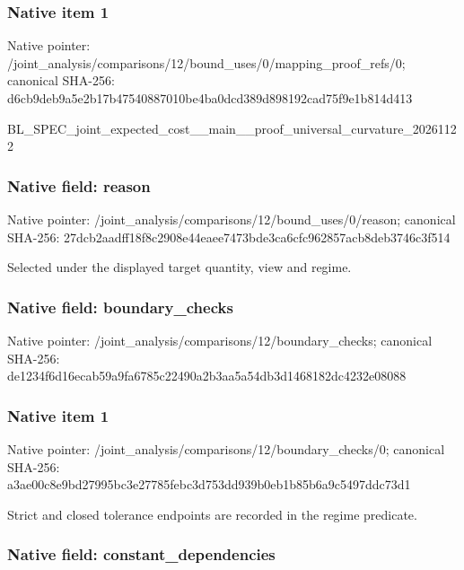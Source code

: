 \documentclass[10pt,a4paper]{article}
\begin{document}
\subsubsection{Native item 1}


Native pointer: /joint\_analysis/comparis\allowbreak{}ons/12/bound\_uses/0/mapp\allowbreak{}ing\_proof\_refs/0; canonical SHA-256: d6cb9deb9a5e2b17b4754088\allowbreak{}7010be4ba0dcd389d898192c\allowbreak{}ad75f9e1b814d413


BL\_SPEC\_joint\_expected\_c\allowbreak{}ost\_\_main\_\_proof\_univers\allowbreak{}al\_curvature\_20261122


\subsubsection{Native field: reason}


Native pointer: /joint\_analysis/comparis\allowbreak{}ons/12/bound\_uses/0/reas\allowbreak{}on; canonical SHA-256: 27dcb2aadff18f8c2908e44e\allowbreak{}aee7473bde3ca6cfc962857a\allowbreak{}cb8deb3746c3f514


Selected under the displayed target quantity, view and regime.


\subsubsection{Native field: boundary\_checks}


Native pointer: /joint\_analysis/comparis\allowbreak{}ons/12/boundary\_checks; canonical SHA-256: de1234f6d16ecab59a9fa678\allowbreak{}5c22490a2b3aa5a54db3d146\allowbreak{}8182dc4232e08088



\subsubsection{Native item 1}


Native pointer: /joint\_analysis/comparis\allowbreak{}ons/12/boundary\_checks/0; canonical SHA-256: a3ae00c8e9bd27995bc3e277\allowbreak{}85febc3d753dd939b0eb1b85\allowbreak{}b6a9c5497ddc73d1


Strict and closed tolerance endpoints are recorded in the regime predicate.


\subsubsection{Native field: constant\_dependencies}
\end{document}

